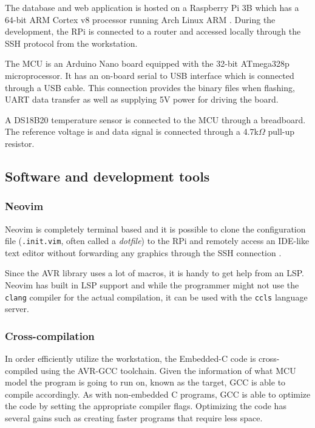 The database and web application is hosted on a Raspberry Pi 3B which has a 64-bit ARM Cortex v8 processor running Arch Linux ARM \cite{RaspberryPiArch}. During the development, the RPi is connected to a router and accessed locally through the SSH protocol from the workstation.

The MCU is an Arduino Nano board equipped with the 32-bit ATmega328p microprocessor. It has an on-board serial to USB interface which is connected through a USB cable. This connection provides the binary files when flashing, UART data transfer as well as supplying 5V power for driving the board.

A DS18B20 temperature sensor is connected to the MCU through a breadboard. The reference voltage is and data signal is connected through a 4.7k$\Omega$ pull-up resistor.

\subsection{Software and development tools}%
\label{sub:software_and_development_tools}
\subsubsection{Neovim}%
\label{ssub:neovim}
Neovim is completely terminal based and it is possible to clone the configuration file (\verb|.init.vim|, often called a \textit{dotfile}) to the RPi and remotely access an IDE-like text editor without forwarding any graphics through the SSH connection \cite{DocumentationNeovim}.

Since the AVR library uses a lot of macros, it is handy to get help from an LSP. Neovim has built in LSP support and while the programmer might not use the \verb|clang| compiler for the actual compilation, it can be used with the \verb|ccls| language server.



\subsubsection{Cross-compilation}%
\label{ssub:cross_compilation}
In order efficiently utilize the workstation, the Embedded-C code is cross-compiled using the AVR-GCC toolchain. Given the information of what MCU model the program is going to run on, known as the target, GCC is able to compile accordingly. As with non-embedded C programs, GCC is able to optimize the code by setting the appropriate compiler flags. Optimizing the code has several gains such as creating faster programs that require less space.


